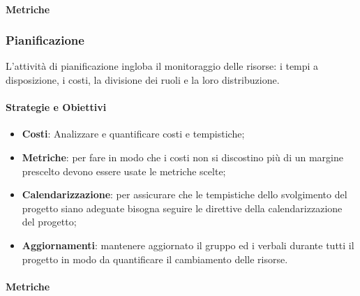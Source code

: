             \paragraph{Metriche}
            
            \hphantom{}
            \def\productquality{
            {   Percentuale dei requisiti soddisfatti,
                $ \frac{ReqSoddisfatti}{ReqTotali}$, 
                $ 100 \% $,
                $ 100 \% $
            },
        }
        
            
        \newpage    
        \subsubsection{Pianificazione}
        L'attività di pianificazione ingloba il monitoraggio delle risorse: i tempi a disposizione, i costi, la divisione dei ruoli e la loro distribuzione.
            \paragraph{Strategie e Obiettivi}
                \begin{itemize}
                    \item \textbf{Costi}: Analizzare e quantificare costi e tempistiche;
                    \item \textbf{Metriche}: per fare in modo che i costi non si discostino più di un margine prescelto devono essere usate le metriche scelte;
                    \item \textbf{Calendarizzazione}: per assicurare che le tempistiche dello svolgimento del progetto siano adeguate bisogna seguire le direttive della calendarizzazione del progetto;
                    \item \textbf{Aggiornamenti}: mantenere aggiornato il gruppo ed i verbali durante tutti il progetto in modo da quantificare il cambiamento delle risorse.
                \end{itemize}
                
           \paragraph{Metriche}
            
